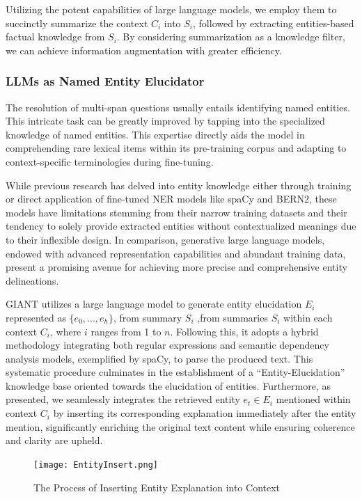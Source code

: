  Utilizing the potent capabilities of large language models, we employ them to succinctly summarize the context $C_i$ into $S_i$, followed by extracting entities-based factual knowledge from $S_i$.
 By considering summarization as a knowledge filter, we can achieve information augmentation with greater efficiency.
 
\subsubsection{LLMs as Named Entity Elucidator}
\label{sec:LLMs as Named Entity Elucidator}
 The resolution of multi-span questions usually entails identifying named entities. This intricate task can be greatly improved by tapping into the specialized knowledge of named entities. This expertise directly aids the model in comprehending rare lexical items within its pre-training corpus and adapting to context-specific terminologies during fine-tuning. 
  
 While previous research has delved into entity knowledge either through training or direct application of fine-tuned NER models like spaCy and BERN2, these models have limitations stemming from their narrow training datasets and their tendency to solely provide extracted entities without contextualized meanings due to their inflexible design.  
 In comparison, generative large language models, endowed with advanced representation capabilities and abundant training data, present a promising avenue for achieving more precise and comprehensive entity delineations.
  
 GIANT utilizes a large language model to generate entity elucidation $E_i$ represented as $\{e_0,...,e_h\}$, from summary $S_i$ ,from summaries $S_i$ within each context $C_i$, where $i$ ranges from 1 to $n$. 
 Following this, it adopts a hybrid methodology integrating both regular expressions and semantic dependency analysis models, exemplified by spaCy, to parse the produced text.
 This systematic procedure culminates in the establishment of a ``Entity-Elucidation'' knowledge base oriented towards the elucidation of entities. 
 Furthermore, as  presented, we seamlessly integrates the retrieved entity $e_t \in E_i$ mentioned within context $C_i$ by inserting its corresponding explanation immediately after the entity mention, significantly enriching the original text content while ensuring coherence and clarity are upheld.
 
\begin{figure}[h]
	\centering
	\texttt{[image: EntityInsert.png]}
	\caption{The Process of Inserting Entity Explanation into Context}
	\label{fig:entity_insertion}
\end{figure}

